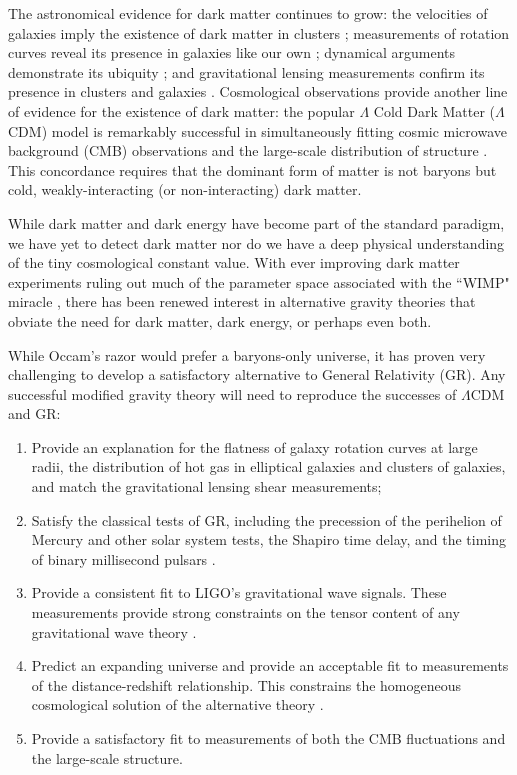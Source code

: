 \documentclass[floats,floatfix,showpacs,amssymb,amsmath,prl,twocolumn,superscriptaddress,nofootinbib, aps]{revtex4-2}
\begin{document}
The astronomical evidence for dark matter continues to grow: the velocities of galaxies imply the existence of dark matter in clusters \citep{Zwicky1933,Einasto1974}; measurements of rotation curves reveal its presence in galaxies like our own \citep{Rubin1978,BosmaPhD,Rubin1980}; dynamical arguments demonstrate its ubiquity \citep{Ostriker1974}; and gravitational lensing measurements confirm its presence in clusters and galaxies \citep{Tyson1990,Wittman2000}. Cosmological observations provide another line of evidence for the existence of dark matter: the popular $\Lambda$ Cold Dark Matter ($\Lambda$CDM) model is remarkably successful in simultaneously fitting cosmic microwave background (CMB) observations and the large-scale distribution of structure \citep[e.g.,][]{Spergel2003, Planck2018}. This concordance requires that the dominant form of matter is not baryons but cold, weakly-interacting (or non-interacting) dark matter.

While dark matter and dark energy have become part of the standard paradigm, we have yet to detect dark matter nor do we have a deep physical understanding of the tiny cosmological constant value. With ever improving dark matter experiments ruling out much of the parameter space associated with the ``WIMP" miracle \citep{Aprile2018,aprile2019}, there has been renewed interest in alternative gravity theories that obviate the need for dark matter, dark energy, or perhaps even both.

While Occam's razor would prefer a baryons-only universe, it has proven very challenging to develop a satisfactory alternative to General Relativity (GR). Any successful modified gravity theory will need to reproduce the successes of $\Lambda$CDM and GR:
\begin{enumerate}
\item Provide an explanation for the flatness of galaxy rotation curves at large radii, the distribution of hot gas in elliptical galaxies and clusters of galaxies, and match the gravitational lensing shear measurements;
\item Satisfy the classical tests of GR, including the precession of the perihelion of Mercury and other solar system tests, the Shapiro time delay, and the timing of binary millisecond pulsars \citep{Will1993}.
\item Provide a consistent fit to LIGO's gravitational wave signals. These measurements provide strong constraints on the tensor content of any gravitational wave theory \citep{LIGOGRTests2019,Abbott2017,Pardo2018, Lagos2019}.
\item Predict an expanding universe and provide an acceptable fit to measurements of the distance-redshift relationship. This constrains the homogeneous cosmological solution of the alternative theory \citep[c.f.,][]{Ishak2019}.
\item Provide a satisfactory fit to measurements of both the CMB fluctuations and the large-scale structure. 
\end{enumerate}
\end{document}
